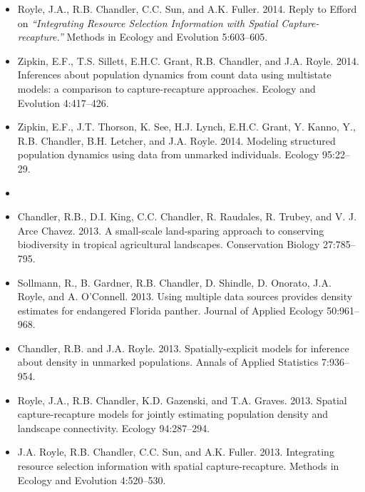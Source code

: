 \begin{itemize}
\item Royle, J.A., R.B. Chandler, C.C. Sun, and A.K. Fuller. 2014. 
  Reply to Efford on   {\it ``Integrating Resource Selection
    Information with Spatial Capture-recapture.''} Methods in Ecology
  and Evolution 5:603--605. 

\item Zipkin, E.F., T.S. Sillett, E.H.C. Grant, R.B. Chandler, and
  J.A. Royle. 2014. Inferences about population dynamics
  from count data using multistate models: a comparison to
  capture-recapture approaches. Ecology and Evolution 4:417--426.

\item Zipkin, E.F., J.T. Thorson, K. See, H.J. Lynch, E.H.C. Grant,
  Y. Kanno, Y., R.B. Chandler, B.H. Letcher, and J.A. Royle.
  2014. Modeling structured population dynamics using
  data from unmarked individuals. Ecology 95:22--29.


\item[] { \\}

\item Chandler, R.B., D.I. King, C.C. Chandler, R. Raudales,
  R. Trubey, and V. J. Arce Chavez. 2013. A small-scale
  land-sparing approach to conserving biodiversity in tropical
  agricultural landscapes. Conservation Biology 27:785--795. 

\item Sollmann, R., B. Gardner, R.B. Chandler, D. Shindle,
  D. Onorato, J.A. Royle, and A. O'Connell. 2013.
  Using multiple data sources provides density estimates for
  endangered Florida panther. Journal of Applied Ecology 50:961--968.

\item Chandler, R.B. and J.A. Royle. 2013.
  Spatially-explicit models for inference about density in unmarked
  populations. Annals of Applied Statistics 7:936--954.

\item Royle, J.A., R.B. Chandler, K.D. Gazenski, and
  T.A. Graves. 2013. Spatial capture-recapture models for jointly
  estimating population density and landscape connectivity. Ecology
  94:287--294. 

\item J.A. Royle, R.B. Chandler, C.C. Sun, and
  A.K. Fuller. 2013. Integrating resource selection information with
  spatial capture-recapture. Methods in Ecology and Evolution 4:520--530.


\end{itemize}
